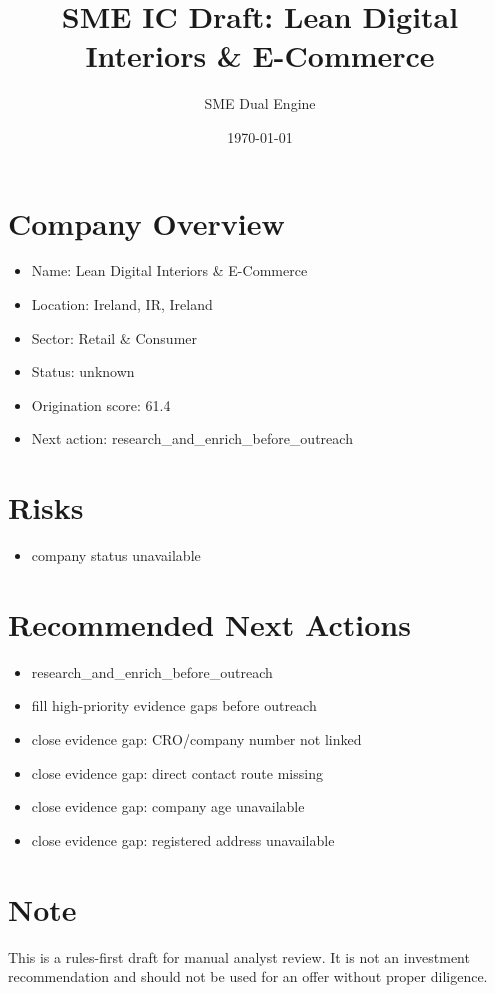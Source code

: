\documentclass[11pt,a4paper]{article}
\title{SME IC Draft: Lean Digital Interiors \& E-Commerce}
\author{SME Dual Engine}
\date{\today}
\begin{document}
\maketitle
\section*{Company Overview}
\begin{itemize}[leftmargin=1.4em]
\item Name: Lean Digital Interiors \& E-Commerce
\item Location: Ireland, IR, Ireland
\item Sector: Retail \& Consumer
\item Status: unknown
\item Origination score: 61.4
\item Next action: research\_and\_enrich\_before\_outreach
\end{itemize}
\section*{Risks}
\begin{itemize}[leftmargin=1.4em]
\item company status unavailable
\end{itemize}
\section*{Recommended Next Actions}
\begin{itemize}[leftmargin=1.4em]
\item research\_and\_enrich\_before\_outreach
\item fill high-priority evidence gaps before outreach
\item close evidence gap: CRO/company number not linked
\item close evidence gap: direct contact route missing
\item close evidence gap: company age unavailable
\item close evidence gap: registered address unavailable
\end{itemize}
\section*{Note}
This is a rules-first draft for manual analyst review. It is not an investment
recommendation and should not be used for an offer without proper diligence.
\end{document}
